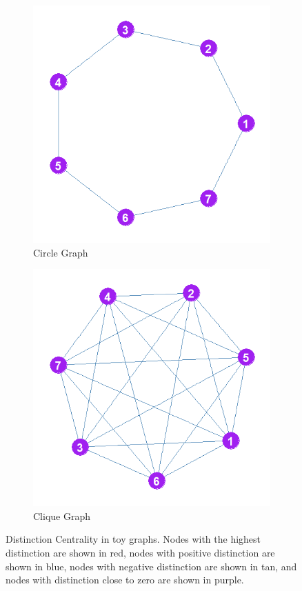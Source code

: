 \documentclass[12pt]{article}
\begin{document}
\begin{figure}[ht!]
\begin{subfigure}[b]{0.3\textwidth}
        \includegraphics[width=1.0\textwidth]{Plots/Toys/circle.png}
            \caption{Circle Graph}
            \label{fig:circle}
    \end{subfigure}
    \begin{subfigure}[b]{0.3\textwidth}
        \includegraphics[width=1.0\textwidth]{Plots/Toys/clique.png}
            \caption{Clique Graph}
            \label{fig:clique}
    \end{subfigure}
    \label{fig:star-circle-clique}
    \caption{Distinction Centrality in toy graphs. Nodes with the highest distinction are shown in red, nodes with positive distinction are shown in blue, nodes with negative distinction are shown in tan, and nodes with distinction close to zero are shown in purple.}
\end{figure}
\end{document}
